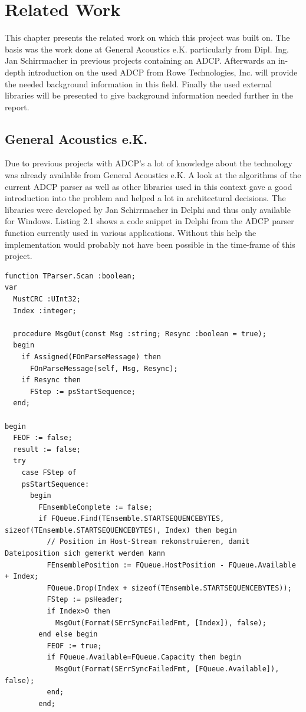 \chapter{Related Work}
This chapter presents the related work on which this project was built on. The basis was the work done at General Acoustics e.K. particularly from Dipl. Ing. Jan Schirrmacher in previous projects containing an ADCP. Afterwards an in-depth introduction on the used ADCP from Rowe Technologies, Inc. will provide the needed background information in this field. Finally the used external libraries will be presented to give background information needed further in the report.

\section{General Acoustics e.K.}
Due to previous projects with ADCP's a lot of knowledge about the technology was already available from General Acoustics e.K. A look at the algorithms of the current ADCP parser as well as other libraries used in this context gave a good introduction into the problem and helped a lot in architectural decisions. The libraries were developed by Jan Schirrmacher in Delphi and thus only available for Windows. Listing 2.1 shows a code snippet in Delphi from the ADCP parser function currently used in various applications. Without this help the implementation would probably not have been possible in the time-frame of this project.
\begin{lstlisting}[language=Delphi, caption=A part from the implementation of the ADCP parser from Jan Schirrmacher]
function TParser.Scan :boolean;
var
  MustCRC :UInt32;
  Index :integer;

  procedure MsgOut(const Msg :string; Resync :boolean = true);
  begin
    if Assigned(FOnParseMessage) then
      FOnParseMessage(self, Msg, Resync);
    if Resync then
      FStep := psStartSequence;
  end;

begin
  FEOF := false;
  result := false;
  try
    case FStep of
    psStartSequence:
      begin
        FEnsembleComplete := false;
        if FQueue.Find(TEnsemble.STARTSEQUENCEBYTES, sizeof(TEnsemble.STARTSEQUENCEBYTES), Index) then begin
          // Position im Host-Stream rekonstruieren, damit Dateiposition sich gemerkt werden kann
          FEnsemblePosition := FQueue.HostPosition - FQueue.Available + Index;
          FQueue.Drop(Index + sizeof(TEnsemble.STARTSEQUENCEBYTES));
          FStep := psHeader;
          if Index>0 then
            MsgOut(Format(SErrSyncFailedFmt, [Index]), false);
        end else begin
          FEOF := true;
          if FQueue.Available=FQueue.Capacity then begin
            MsgOut(Format(SErrSyncFailedFmt, [FQueue.Available]), false);
          end;
        end;
\end{lstlisting}


